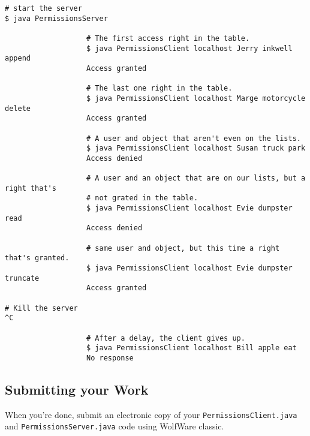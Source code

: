 \documentclass{article}
\begin{document}
\begin{enumerate}
\begin{verbatim}
# start the server
$ java PermissionsServer

                   # The first access right in the table.
                   $ java PermissionsClient localhost Jerry inkwell append
                   Access granted

                   # The last one right in the table.
                   $ java PermissionsClient localhost Marge motorcycle delete
                   Access granted

                   # A user and object that aren't even on the lists.
                   $ java PermissionsClient localhost Susan truck park
                   Access denied

                   # A user and an object that are on our lists, but a right that's
                   # not grated in the table.
                   $ java PermissionsClient localhost Evie dumpster read
                   Access denied

                   # same user and object, but this time a right that's granted.
                   $ java PermissionsClient localhost Evie dumpster truncate
                   Access granted

# Kill the server
^C

                   # After a delay, the client gives up.
                   $ java PermissionsClient localhost Bill apple eat
                   No response
\end{verbatim}

\subsection*{Submitting your Work}

When you're done, submit an electronic copy of your
\texttt{PermissionsClient.java} and \texttt{PermissionsServer.java}
code using WolfWare classic.

\end{enumerate}
\end{document}

